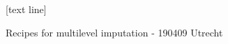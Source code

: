 [text line]{%
  \parbox{\linewidth}{\vspace*{-8pt}Recipes for multilevel imputation - 190409 Utrecht\hfill\insertshortauthor\hfill\insertpagenumber}}

